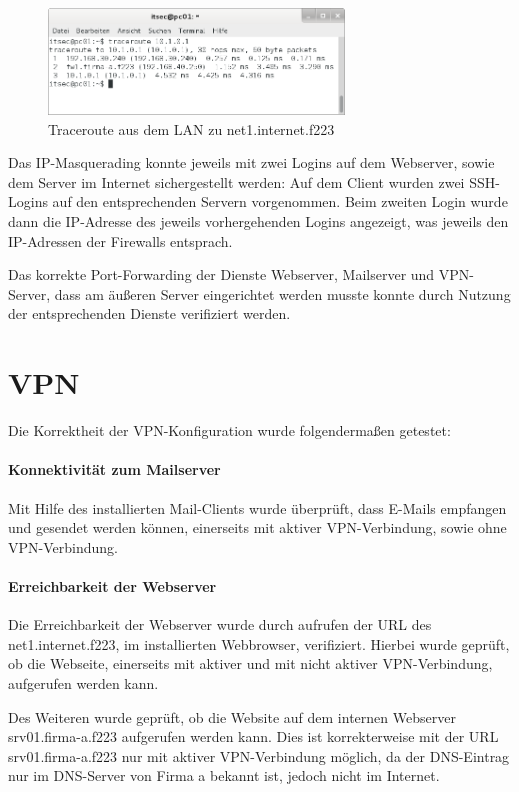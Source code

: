\begin{figure}[h!]
	\centering
		\includegraphics[width=0.7\textwidth]{figures/pc01_traceroute_net1.png}
	\caption{Traceroute aus dem LAN zu net1.internet.f223}
	\label{fig:pc01_traceroute_net1}
\end{figure}


Das IP-Masquerading konnte jeweils mit zwei Logins auf dem Webserver, sowie dem Server im Internet sichergestellt werden: Auf dem Client wurden zwei SSH-Logins auf den entsprechenden Servern vorgenommen. Beim zweiten Login wurde dann die IP-Adresse des jeweils vorhergehenden Logins angezeigt, was jeweils den IP-Adressen der Firewalls entsprach.


Das korrekte Port-Forwarding der Dienste Webserver, Mailserver und VPN-Server, dass am äußeren Server eingerichtet werden musste konnte durch Nutzung der entsprechenden Dienste verifiziert werden.

\section{VPN}
Die Korrektheit der VPN-Konfiguration wurde folgendermaßen getestet:

\paragraph{Konnektivität zum Mailserver}
Mit Hilfe des installierten Mail-Clients wurde überprüft, dass E-Mails empfangen und gesendet werden können, einerseits mit aktiver VPN-Verbindung, sowie ohne VPN-Verbindung.

\paragraph{Erreichbarkeit der Webserver}
Die Erreichbarkeit der Webserver wurde durch aufrufen der URL des net1.internet.f223, im installierten Webbrowser, verifiziert. Hierbei wurde geprüft, ob die Webseite, einerseits mit aktiver und mit nicht aktiver VPN-Verbindung, aufgerufen werden kann.

Des Weiteren wurde geprüft, ob die Website auf dem internen Webserver srv01.firma-a.f223 aufgerufen werden kann. Dies ist korrekterweise mit der URL srv01.firma-a.f223 nur mit aktiver VPN-Verbindung möglich, da der DNS-Eintrag nur im DNS-Server von Firma a bekannt ist, jedoch nicht im Internet.

